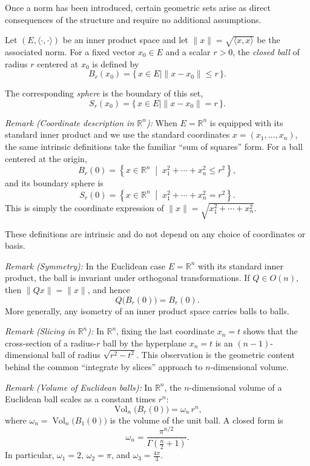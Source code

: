 \medskip

Once a norm has been introduced, certain geometric sets arise as direct
consequences of the structure and require no additional assumptions.

\medskip

Let $(E,\langle\cdot,\cdot\rangle)$ be an inner product space and let
$\|x\|=\sqrt{\langle x,x\rangle}$ be the associated norm.
For a fixed vector $x_0\in E$ and a scalar $r>0$, the \emph{closed ball}
of radius $r$ centered at $x_0$ is defined by
\[
B_r(x_0)=\{\,x\in E \mid \|x-x_0\|\le r\,\}.
\]

The corresponding \emph{sphere} is the boundary of this set,
\[
S_r(x_0)=\{\,x\in E \mid \|x-x_0\|= r\,\}.
\]

\textit{Remark (Coordinate description in $\mathbb{R}^n$):}
When $E=\mathbb{R}^n$ is equipped with its standard inner product and we use
the standard coordinates $x=(x_1,\dots,x_n)$, the same intrinsic definitions
take the familiar ``sum of squares'' form.
For a ball centered at the origin,
\[
B_r(0)=\left\{x\in\mathbb{R}^n\;\middle|\;x_1^2+\cdots+x_n^2\le r^2\right\},
\]
and its boundary sphere is
\[
S_r(0)=\left\{x\in\mathbb{R}^n\;\middle|\;x_1^2+\cdots+x_n^2=r^2\right\}.
\]
This is simply the coordinate expression of
$\|x\|=\sqrt{x_1^2+\cdots+x_n^2}$.

\medskip

These definitions are intrinsic and do not depend on any choice of coordinates
or basis.

\medskip

\textit{Remark (Symmetry):}
In the Euclidean case $E=\mathbb{R}^n$ with its standard inner product, the
ball is invariant under orthogonal transformations.
If $Q\in O(n)$, then $\|Qx\|=\|x\|$, and hence
\[
Q\bigl(B_r(0)\bigr)=B_r(0).
\]
More generally, any isometry of an inner product space carries balls to balls.

\medskip

\textit{Remark (Slicing in $\mathbb{R}^n$):}
In $\mathbb{R}^n$, fixing the last coordinate $x_n=t$ shows that the
cross-section of a radius-$r$ ball by the hyperplane $x_n=t$ is an
$(n-1)$-dimensional ball of radius $\sqrt{r^2-t^2}$.
This observation is the geometric content behind the common
``integrate by slices'' approach to $n$-dimensional volume.

\medskip

\textit{Remark (Volume of Euclidean balls):}
In $\mathbb{R}^n$, the $n$-dimensional volume of a Euclidean ball scales as a
constant times $r^n$:
\[
\operatorname{Vol}_n\bigl(B_r(0)\bigr)=\omega_n\,r^n,
\]
where $\omega_n=\operatorname{Vol}_n\bigl(B_1(0)\bigr)$ is the volume of the
unit ball. A closed form is
\[
\omega_n=\frac{\pi^{n/2}}{\Gamma\!\left(\frac{n}{2}+1\right)}.
\]
In particular, $\omega_1=2$, $\omega_2=\pi$, and $\omega_3=\frac{4\pi}{3}$.

